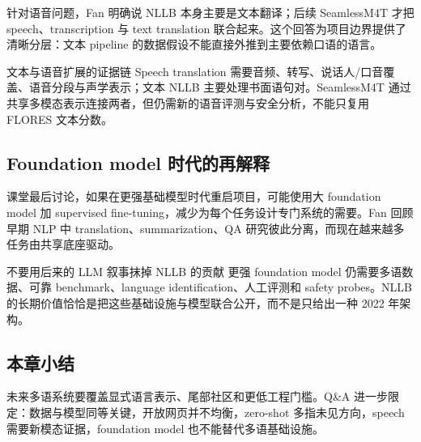 针对语音问题，Fan 明确说 NLLB 本身主要是文本翻译；后续 SeamlessM4T 才把 speech、transcription 与 text translation 联合起来。这个回答为项目边界提供了清晰分层：文本 pipeline 的数据假设不能直接外推到主要依赖口语的语言。

\begin{knowledgebox}{文本与语音扩展的证据链}
Speech translation 需要音频、转写、说话人/口音覆盖、语音分段与声学表示；文本 NLLB 主要处理书面语句对。SeamlessM4T 通过共享多模态表示连接两者，但仍需新的语音评测与安全分析，不能只复用 FLORES 文本分数。
\end{knowledgebox}

\subsection{Foundation model 时代的再解释}

课堂最后讨论，如果在更强基础模型时代重启项目，可能使用大 foundation model 加 supervised fine-tuning，减少为每个任务设计专门系统的需要。Fan 回顾早期 NLP 中 translation、summarization、QA 研究彼此分离，而现在越来越多任务由共享底座驱动。


\begin{warningbox}{不要用后来的 LLM 叙事抹掉 NLLB 的贡献}
更强 foundation model 仍需要多语数据、可靠 benchmark、language identification、人工评测和 safety probes。NLLB 的长期价值恰恰是把这些基础设施与模型联合公开，而不是只给出一种 2022 年架构。
\end{warningbox}

\subsection{本章小结}

未来多语系统要覆盖显式语言表示、尾部社区和更低工程门槛。Q\&A 进一步限定：数据与模型同等关键，开放网页并不均衡，zero-shot 多指未见方向，speech 需要新模态证据，foundation model 也不能替代多语基础设施。

